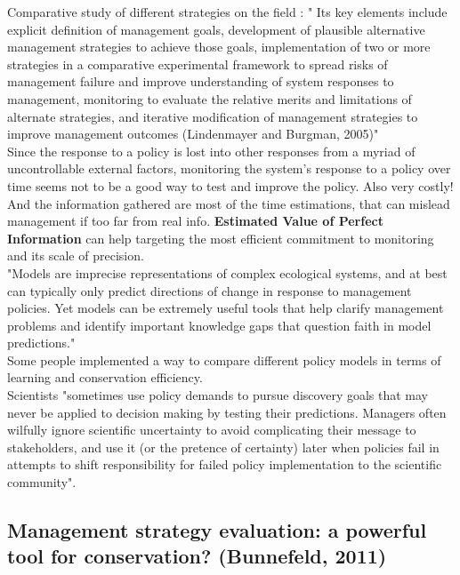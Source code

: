 \documentclass[12pt]{article}
\begin{document}
Comparative study of different strategies on the field : " Its key elements include explicit
definition of management goals, development of plausible alternative management strategies to achieve those goals, implementation of two or more strategies in a comparative experimental
framework to spread risks of management failure and improve
understanding of system responses to management, monitoring
to evaluate the relative merits and limitations of alternate strategies, and iterative modification of management strategies to improve management outcomes (Lindenmayer and Burgman, 2005)"\\
Since the response to a policy is lost into other responses from a myriad of uncontrollable external factors, monitoring the system's response to a policy over time seems not to be a good way to test and improve the policy. Also very costly! And the information gathered are most of the time estimations, that can mislead management if too far from real info. \textbf{Estimated Value of Perfect Information} can help targeting the most efficient commitment to monitoring and its scale of precision.\\
"Models are imprecise representations of complex ecological
systems, and at best can typically only predict directions of change
in response to management policies. Yet models can be extremely
useful tools that help clarify management problems and identify
important knowledge gaps that question faith in model predictions."\\
Some people implemented a way to compare different policy models in terms of learning and conservation efficiency.\\
Scientists "sometimes use policy
demands to pursue discovery goals that may never be applied to
decision making by testing their predictions. Managers often wilfully ignore scientific uncertainty to avoid complicating their message to stakeholders, and use it (or the pretence of certainty) later
when policies fail in attempts to shift responsibility for failed policy implementation to the scientific community".

\subsection{Management strategy evaluation: a powerful tool for conservation? (Bunnefeld, 2011)}
\end{document}
